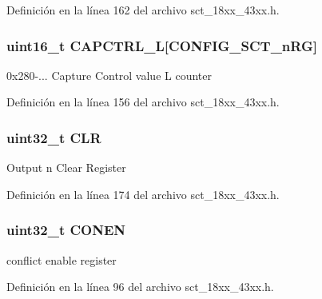 Definición en la línea 162 del archivo sct\+\_\+18xx\+\_\+43xx.\+h.

\subsubsection[{\texorpdfstring{C\+A\+P\+C\+T\+R\+L\+\_\+L}{CAPCTRL_L}}]{ uint16\+\_\+t C\+A\+P\+C\+T\+R\+L\+\_\+L\mbox{[}{\bf C\+O\+N\+F\+I\+G\+\_\+\+S\+C\+T\+\_\+n\+RG}\mbox{]}}\hypertarget{struct_l_p_c___s_c_t___t_ad5fa6eafb9d9896d4cf1bb5fe35b306c}{}\label{struct_l_p_c___s_c_t___t_ad5fa6eafb9d9896d4cf1bb5fe35b306c}
0x280-\/... Capture Control value L counter 

Definición en la línea 156 del archivo sct\+\_\+18xx\+\_\+43xx.\+h.

\subsubsection[{\texorpdfstring{C\+LR}{CLR}}]{\setlength{\rightskip}{0pt plus 5cm}uint32\+\_\+t C\+LR}\hypertarget{struct_l_p_c___s_c_t___t_a15547ec8f9217998441e30b252c9814d}{}\label{struct_l_p_c___s_c_t___t_a15547ec8f9217998441e30b252c9814d}
Output n Clear Register 

Definición en la línea 174 del archivo sct\+\_\+18xx\+\_\+43xx.\+h.

\subsubsection[{\texorpdfstring{C\+O\+N\+EN}{CONEN}}]{ uint32\+\_\+t C\+O\+N\+EN}\hypertarget{struct_l_p_c___s_c_t___t_a23f3acc7f5070e187e550137ab864ce4}{}\label{struct_l_p_c___s_c_t___t_a23f3acc7f5070e187e550137ab864ce4}
conflict enable register 

Definición en la línea 96 del archivo sct\+\_\+18xx\+\_\+43xx.\+h.

